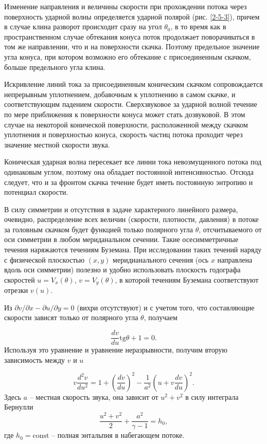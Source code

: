 \documentclass[specialist, subf, href, colorlinks=true, 14pt, final]{disser}
\theoremstyle{definition}
\newcommand{\const}{\text{const}}
\begin{document}
Изменение направления и величины скорости при прохождении потока через поверхность ударной волны определяется ударной полярой (рис. \ref{2-5-3}), причем в случае клина разворот происходит сразу на угол $\theta_0$, в то время как в пространственном случае  обтекания конуса поток продолжает поворачиваться в том же направлении, что и на поверхности скачка. Поэтому предельное значение угла конуса, при котором возможно его обтекание с присоединенным скачком, больше предельного угла клина.

Искривление линий тока за присоединенным коническим скачком
сопровождается непрерывным уплотнением, добавочным к уплотнению
в самом скачке, и соответствующим падением скорости. 
Сверхзвуковое за ударной волной течение по мере приближения к поверхности конуса может стать дозвуковой. В этом случае на некоторой 
конической поверхности, расположенной между скачком уплотнения и 
поверхностью конуса, скорость частиц потока проходит через 
значение местной скорости звука.

Коническая ударная волна пересекает все линии тока невозмущенного потока под одинаковым углом, поэтому она обладает постоянной интенсивностью. Отсюда следует, что и за фронтом скачка течение будет иметь постоянную энтропию и потенциал скорости.

В силу симметрии и отсутствия в задаче характерного линейного размера, очевидно, распределение всех величин (скорости, плотности, давления) в потоке за головным скачком будет функцией только полярного угла $\theta$, отсчитываемого от оси симметрии в любом мериданальном сечении. Такие осесимметричные течения наряжаются течениям Буземана. При исследовании таких течений наряду с физической плоскостью $(x,y)$ меридианального сечения (ось $x$ направлена вдоль оси симметрии) полезно и удобно использовать плоскость годографа скоростей $u = V_x(\theta)$, $v = V_y(\theta)$, в которой течениям Буземана соответствуют отрезки $v(u)$.

Из $\partial v/ \partial x - \partial u / \partial y = 0$ (вихри отсутствуют) и с учетом того, что составляющие скорости зависят только от полярного угла $\theta$, получаем
\addtocounter{equation}{1}
\begin{equation}\label{eq:251}
	 \frac{d v}{d u} \text{tg}\theta + 1 = 0. 
	\tag{1}
\end{equation} 
Используя это уравнение и уравнение неразрывности, получим 
вторую зависимость между $v$ и $u$
\addtocounter{equation}{1}
\begin{equation}\label{eq:252}
   v \frac{d^2 v}{d u^2} = 1 + \left( \frac{d v}{d u} \right)^2 - \frac{1}{a^2} \left(u + v \frac{dv}{du} \right)^2 . 
  \tag{2}
\end{equation} 
Здесь $a$ -- местная скорость звука, она зависит от $u^2 + v^2$ в силу интеграла Бернулли
\[
  \frac{u^2 + v^2}{2} + \frac{a^2}{\gamma - 1} = h_0,
\]
где $h_{0} = \const$ -- полная энтальпия в набегающем потоке.
\end{document}
